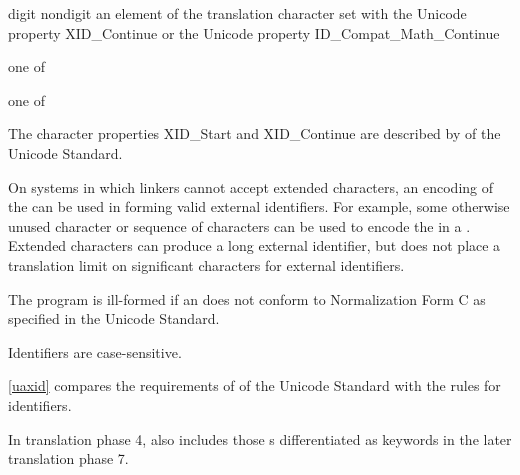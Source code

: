 \begin{bnf}
\br
    digit\br
    nondigit\br
    \textnormal%
    {an element of the translation character set with the Unicode property XID_Continue or the Unicode property ID_Compat_Math_Continue}
\end{bnf}

\begin{bnf}
 \textnormal{one of}\br
    \br
    \br
    \br
\end{bnf}

\begin{bnf}
 \textnormal{one of}\br
\end{bnf}

\pnum
{}%
%
\begin{note}
The character properties XID_Start and XID_Continue are described by  of the Unicode Standard.
\begin{footnote}
On systems in which linkers cannot accept extended
characters, an encoding of the  can be used in
forming valid external identifiers. For example, some otherwise unused
character or sequence of characters can be used to encode the
 in a . Extended
characters can produce a long external identifier, but \Cpp{} does not
place a translation limit on significant characters for external
identifiers.
\end{footnote}
\end{note}
The program is ill-formed
if an  does not conform to
Normalization Form C as specified in the Unicode Standard.
\begin{note}
Identifiers are case-sensitive.
\end{note}
\begin{note}
\ref{uaxid} compares the requirements of  of the Unicode Standard
with the \Cpp{} rules for identifiers.
\end{note}
\begin{note}
In translation phase 4,
 also includes
those s
differentiated as keywords
in the later translation phase 7.
\end{note}

